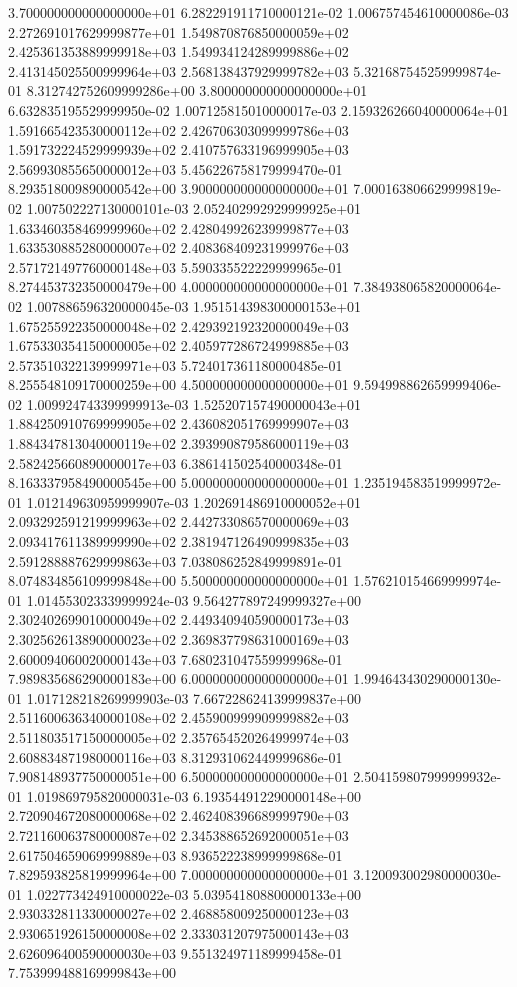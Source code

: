 \documentclass{article}
\begin{document}
\begin{center}
{3.700000000000000000e+01 6.282291911710000121e-02 1.006757454610000086e-03 2.272691017629999877e+01 1.549870876850000059e+02 2.425361353889999918e+03 1.549934124289999886e+02 2.413145025500999964e+03 2.568138437929999782e+03 5.321687545259999874e-01 8.312742752609999286e+00
3.800000000000000000e+01 6.632835195529999950e-02 1.007125815010000017e-03 2.159326266040000064e+01 1.591665423530000112e+02 2.426706303099999786e+03 1.591732224529999939e+02 2.410757633196999905e+03 2.569930855650000012e+03 5.456226758179999470e-01 8.293518009890000542e+00
3.900000000000000000e+01 7.000163806629999819e-02 1.007502227130000101e-03 2.052402992929999925e+01 1.633460358469999960e+02 2.428049926239999877e+03 1.633530885280000007e+02 2.408368409231999976e+03 2.571721497760000148e+03 5.590335522229999965e-01 8.274453732350000479e+00
4.000000000000000000e+01 7.384938065820000064e-02 1.007886596320000045e-03 1.951514398300000153e+01 1.675255922350000048e+02 2.429392192320000049e+03 1.675330354150000005e+02 2.405977286724999885e+03 2.573510322139999971e+03 5.724017361180000485e-01 8.255548109170000259e+00
4.500000000000000000e+01 9.594998862659999406e-02 1.009924743399999913e-03 1.525207157490000043e+01 1.884250910769999905e+02 2.436082051769999907e+03 1.884347813040000119e+02 2.393990879586000119e+03 2.582425660890000017e+03 6.386141502540000348e-01 8.163337958490000545e+00
5.000000000000000000e+01 1.235194583519999972e-01 1.012149630959999907e-03 1.202691486910000052e+01 2.093292591219999963e+02 2.442733086570000069e+03 2.093417611389999990e+02 2.381947126490999835e+03 2.591288887629999863e+03 7.038086252849999891e-01 8.074834856109999848e+00
5.500000000000000000e+01 1.576210154669999974e-01 1.014553023339999924e-03 9.564277897249999327e+00 2.302402699010000049e+02 2.449340940590000173e+03 2.302562613890000023e+02 2.369837798631000169e+03 2.600094060020000143e+03 7.680231047559999968e-01 7.989835686290000183e+00
6.000000000000000000e+01 1.994643430290000130e-01 1.017128218269999903e-03 7.667228624139999837e+00 2.511600636340000108e+02 2.455900999909999882e+03 2.511803517150000005e+02 2.357654520264999974e+03 2.608834871980000116e+03 8.312931062449999686e-01 7.908148937750000051e+00
6.500000000000000000e+01 2.504159807999999932e-01 1.019869795820000031e-03 6.193544912290000148e+00 2.720904672080000068e+02 2.462408396689999790e+03 2.721160063780000087e+02 2.345388652692000051e+03 2.617504659069999889e+03 8.936522238999999868e-01 7.829593825819999964e+00
7.000000000000000000e+01 3.120093002980000030e-01 1.022773424910000022e-03 5.039541808800000133e+00 2.930332811330000027e+02 2.468858009250000123e+03 2.930651926150000008e+02 2.333031207975000143e+03 2.626096400590000030e+03 9.551324971189999458e-01 7.753999488169999843e+00
}
\end{center}
\end{document}
